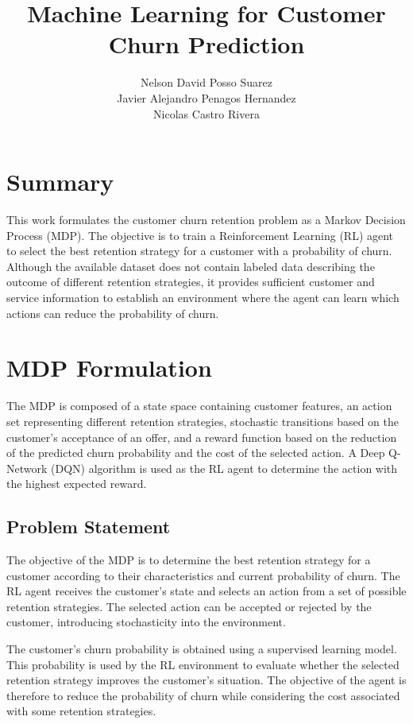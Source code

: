 \documentclass{article}
\title{ Machine Learning for Customer Churn Prediction}
\author{Nelson David Posso Suarez \\ Javier Alejandro Penagos Hernandez \\ Nicolas Castro Rivera }
\date{}
\begin{document}
\maketitle

\section{Summary}

This work formulates the customer churn retention problem as a Markov Decision Process (MDP).
The objective is to train a Reinforcement Learning (RL) agent to select the best retention strategy
for a customer with a probability of churn. Although the available dataset does not contain labeled
data describing the outcome of different retention strategies, it provides sufficient customer and
service information to establish an environment where the agent can learn which actions can reduce
the probability of churn.



\section{MDP Formulation}
The MDP is composed of a state space containing customer features, an action set representing
different retention strategies, stochastic transitions based on the customer's acceptance of an
offer, and a reward function based on the reduction of the predicted churn probability and the
cost of the selected action. A Deep Q-Network (DQN) algorithm is used as the RL agent to determine
the action with the highest expected reward.

\subsection{Problem Statement}

The objective of the MDP is to determine the best retention strategy for a customer according to
their characteristics and current probability of churn. The RL agent receives the customer's state
and selects an action from a set of possible retention strategies. The selected action can be
accepted or rejected by the customer, introducing stochasticity into the environment.

The customer's churn probability is obtained using a supervised learning model. This probability
is used by the RL environment to evaluate whether the selected retention strategy improves the
customer's situation. The objective of the agent is therefore to reduce the probability of churn
while considering the cost associated with some retention strategies.
\end{document}
